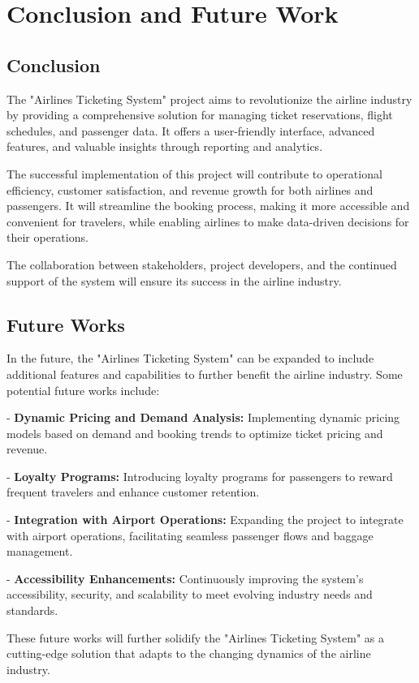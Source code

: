 \section{Conclusion and Future Work}
\subsection{Conclusion}
The "Airlines Ticketing System" project aims to revolutionize the airline industry by providing a comprehensive solution for managing ticket reservations, flight schedules, and passenger data. It offers a user-friendly interface, advanced features, and valuable insights through reporting and analytics.

The successful implementation of this project will contribute to operational efficiency, customer satisfaction, and revenue growth for both airlines and passengers. It will streamline the booking process, making it more accessible and convenient for travelers, while enabling airlines to make data-driven decisions for their operations.

The collaboration between stakeholders, project developers, and the continued support of the system will ensure its success in the airline industry.

\subsection{Future Works}
In the future, the "Airlines Ticketing System" can be expanded to include additional features and capabilities to further benefit the airline industry. Some potential future works include:

- \textbf{Dynamic Pricing and Demand Analysis:} Implementing dynamic pricing models based on demand and booking trends to optimize ticket pricing and revenue.

- \textbf{Loyalty Programs:} Introducing loyalty programs for passengers to reward frequent travelers and enhance customer retention.

- \textbf{Integration with Airport Operations:} Expanding the project to integrate with airport operations, facilitating seamless passenger flows and baggage management.

- \textbf{Accessibility Enhancements:} Continuously improving the system's accessibility, security, and scalability to meet evolving industry needs and standards.

These future works will further solidify the "Airlines Ticketing System" as a cutting-edge solution that adapts to the changing dynamics of the airline industry.


\clearpage